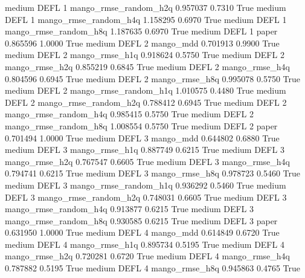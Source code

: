     medium     DEFL                 1 mango_rmse_random_h2q   0.957037      0.7310    True
    medium     DEFL                 1 mango_rmse_random_h4q   1.158295      0.6970    True
    medium     DEFL                 1 mango_rmse_random_h8q   1.187635      0.6970    True
    medium     DEFL                 1                 paper   0.865596      1.0000    True
    medium     DEFL                 2             mango_mdd   0.701913      0.9900    True
    medium     DEFL                 2        mango_rmse_h1q   0.918624      0.5750    True
    medium     DEFL                 2        mango_rmse_h2q   0.855219      0.6845    True
    medium     DEFL                 2        mango_rmse_h4q   0.804596      0.6945    True
    medium     DEFL                 2        mango_rmse_h8q   0.995078      0.5750    True
    medium     DEFL                 2 mango_rmse_random_h1q   1.010575      0.4480    True
    medium     DEFL                 2 mango_rmse_random_h2q   0.788412      0.6945    True
    medium     DEFL                 2 mango_rmse_random_h4q   0.985415      0.5750    True
    medium     DEFL                 2 mango_rmse_random_h8q   1.008554      0.5750    True
    medium     DEFL                 2                 paper   0.701494      1.0000    True
    medium     DEFL                 3             mango_mdd   0.644802      0.6880    True
    medium     DEFL                 3        mango_rmse_h1q   0.887749      0.6215    True
    medium     DEFL                 3        mango_rmse_h2q   0.767547      0.6605    True
    medium     DEFL                 3        mango_rmse_h4q   0.794741      0.6215    True
    medium     DEFL                 3        mango_rmse_h8q   0.978723      0.5460    True
    medium     DEFL                 3 mango_rmse_random_h1q   0.936292      0.5460    True
    medium     DEFL                 3 mango_rmse_random_h2q   0.748031      0.6605    True
    medium     DEFL                 3 mango_rmse_random_h4q   0.913877      0.6215    True
    medium     DEFL                 3 mango_rmse_random_h8q   0.930585      0.6215    True
    medium     DEFL                 3                 paper   0.631950      1.0000    True
    medium     DEFL                 4             mango_mdd   0.614849      0.6720    True
    medium     DEFL                 4        mango_rmse_h1q   0.895734      0.5195    True
    medium     DEFL                 4        mango_rmse_h2q   0.720281      0.6720    True
    medium     DEFL                 4        mango_rmse_h4q   0.787882      0.5195    True
    medium     DEFL                 4        mango_rmse_h8q   0.945863      0.4765    True
